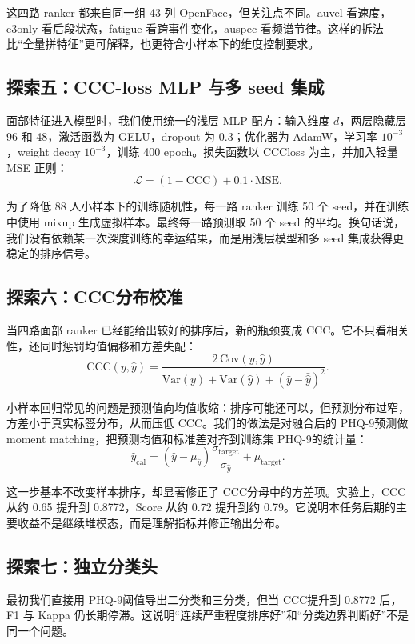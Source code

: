 \documentclass[UTF8,zihao=-4,fontset=windows]{ctexart}
\newcommand{\phq}{PHQ-9}
\newcommand{\ccc}{CCC}
\begin{document}
这四路 ranker 都来自同一组 43 列 OpenFace，但关注点不同。auvel 看速度，e3only 看后段状态，fatigue 看跨事件变化，auspec 看频谱节律。这样的拆法比“全量拼特征”更可解释，也更符合小样本下的维度控制要求。

\subsection{探索五：\ccc-loss MLP 与多 seed 集成}

面部特征进入模型时，我们使用统一的浅层 MLP 配方：输入维度 $d$，两层隐藏层 96 和 48，激活函数为 GELU，dropout 为 0.3；优化器为 AdamW，学习率 $10^{-3}$，weight decay $10^{-3}$，训练 400 epoch。损失函数以 \ccc loss 为主，并加入轻量 MSE 正则：
\[
\mathcal{L}=(1-\mathrm{CCC})+0.1\cdot\mathrm{MSE}.
\]

为了降低 88 人小样本下的训练随机性，每一路 ranker 训练 50 个 seed，并在训练中使用 mixup 生成虚拟样本。最终每一路预测取 50 个 seed 的平均。换句话说，我们没有依赖某一次深度训练的幸运结果，而是用浅层模型和多 seed 集成获得更稳定的排序信号。

\subsection{探索六：\ccc 分布校准}

当四路面部 ranker 已经能给出较好的排序后，新的瓶颈变成 \ccc。它不只看相关性，还同时惩罚均值偏移和方差失配：
\[
\mathrm{CCC}(y,\hat y)=\frac{2\,\mathrm{Cov}(y,\hat y)}
{\mathrm{Var}(y)+\mathrm{Var}(\hat y)+(\bar y-\bar{\hat y})^2}.
\]

小样本回归常见的问题是预测值向均值收缩：排序可能还可以，但预测分布过窄，方差小于真实标签分布，从而压低 \ccc。我们的做法是对融合后的 \phq 预测做 moment matching，把预测均值和标准差对齐到训练集 \phq 的统计量：
\[
\hat y_{\mathrm{cal}}=(\hat y-\mu_{\hat y})\frac{\sigma_{\mathrm{target}}}{\sigma_{\hat y}}+\mu_{\mathrm{target}}.
\]

这一步基本不改变样本排序，却显著修正了 \ccc 分母中的方差项。实验上，\ccc 从约 0.65 提升到 0.8772，Score 从约 0.72 提升到约 0.79。它说明本任务后期的主要收益不是继续堆模态，而是理解指标并修正输出分布。

\subsection{探索七：独立分类头}

最初我们直接用 \phq 阈值导出二分类和三分类，但当 \ccc 提升到 0.8772 后，F1 与 Kappa 仍长期停滞。这说明“连续严重程度排序好”和“分类边界判断好”不是同一个问题。
\end{document}
